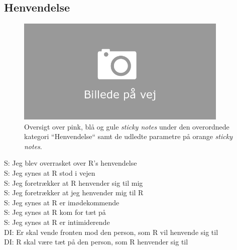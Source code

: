 \subsection{Henvendelse}
%
\begin{figure}[H]
\centering
\includegraphics[width = 0.9\textwidth]{Figure/AffinityDiagram/Henvendelse} 
\caption{Oversigt over pink, blå og gule \textit{sticky notes} under den overordnede kategori ``Henvendelse`` samt de udledte parametre på orange \textit{sticky notes}.}
\label{fig:AFHenvendelse}
\end{figure}
\noindent
%
S: Jeg blev overrasket over R's henvendelse\\
S: Jeg synes at R stod i vejen\\
S: Jeg foretrækker at R henvender sig til mig\\
S: Jeg foretrækker at jeg henvender mig til R\\
S: Jeg synes at R er imødekommende\\
S: Jeg synes at R kom for tæt på\\
S: Jeg synes at R er intimiderende\\
DI: Er skal vende fronten mod den person, som R vil henvende sig til\\
DI: R skal være tæt på den person, som R henvender sig til\\

